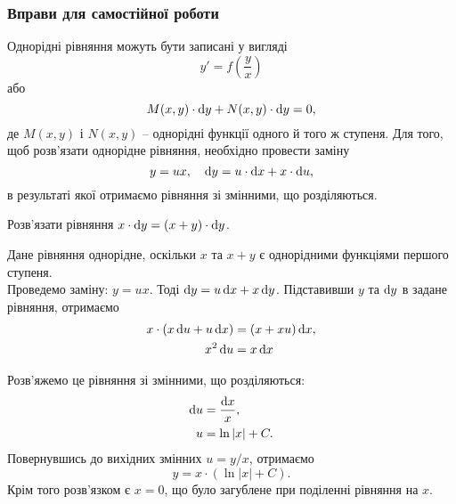 \subsubsection{Вправи для самостійної роботи}

Однорідні рівняння можуть бути записані у вигляді \[y' = f \left( \frac{y}{x} \right)\] або  \[ M(x, y)\cdot\mathop{}\!\mathrm{d} y + N(x, y) \cdot \mathop{}\!\mathrm{d} y = 0, \] де $M(x, y)$ і $N(x, y)$ -- однорідні функції одного й того ж ступеня. Для того, щоб розв’язати однорідне рівняння, необхідно провести заміну \[y = u x, \quad \mathop{}\!\mathrm{d} y = u \cdot \mathop{}\!\mathrm{d} x + x \cdot \mathop{}\!\mathrm{d} u,\] в результаті якої отримаємо рівняння зі змінними, що розділяються. 

\begin{example}
	Розв’язати рівняння $x \cdot \mathop{}\!\mathrm{d} y = (x + y) \cdot \mathop{}\!\mathrm{d} y$. 
\end{example}

\begin{solution}
	Дане рівняння однорідне, оскільки $x$ та $x + y$ є однорідними функціями першого ступеня. \\

	Проведемо заміну: $y = u x$. Тоді $\mathop{}\!\mathrm{d} y = u \mathop{}\!\mathrm{d} x + x \mathop{}\!\mathrm{d} y$. Підставивши $y$ та $\mathop{}\!\mathrm{d} y$ в задане рівняння, отримаємо  
	\begin{align*}
		x \cdot (x \mathop{}\!\mathrm{d} u + u \mathop{}\!\mathrm{d} x) &= (x + x u) \mathop{}\!\mathrm{d} x, \\
		x^2 \mathop{}\!\mathrm{d} u &= x \mathop{}\!\mathrm{d} x
	\end{align*}

	Розв’яжемо це рівняння зі змінними, що розділяються:
	\begin{align*}
		\mathop{}\!\mathrm{d} u &= \frac{\mathop{}\!\mathrm{d} x}{x}, \\
		u &= \ln |x| + C.
	\end{align*}
	Повернувшись до вихідних змінних $u = y / x$, отримаємо \[y = x \cdot (\ln |x| + C).\] Крім того розв’язком є $x = 0$, що було загублене при поділенні рівняння на $x$.
\end{solution}


